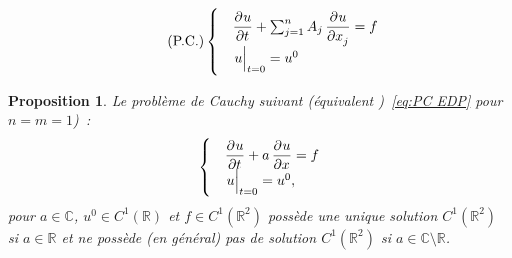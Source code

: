 \documentclass{report}
\newcommand{\C}{{\mathbb C}}
\newcommand{\R}{{\mathbb R}}
\newcommand{\restr}[2]{\left.#1\vphantom{\big|}\right|_{#2}}
\newtheorem{prp}[thm]{Proposition}
\theoremstyle{definition}
\theoremstyle{remark}
\begin{document}
\begin{equation}\label{eq:PC EDP}\tag{P.C.}
	\begin{cases}&\dpd ut + \sum_{j=1}^nA_j\dpd u{x_j} = f\\&\restr u{t=0} = u^0\end{cases}
\end{equation}

\begin{prp} Le problème de Cauchy suivant (équivalent )~\eqref{eq:PC EDP} pour $n=m=1$)~:
\[\begin{cases}&\dpd ut + a\dpd ux = f\\&\restr u{t=0} = u^0,\end{cases}\]
pour $a \in \C$, $u^0 \in C^1(\R)$ et $f \in C^1(\R^2)$ possède une unique solution $C^1(\R^2)$ si $a \in \R$ et ne possède (en général) pas de solution $C^1(\R^2)$
si $a \in \C \setminus \R$.
\end{prp}
\end{document}
